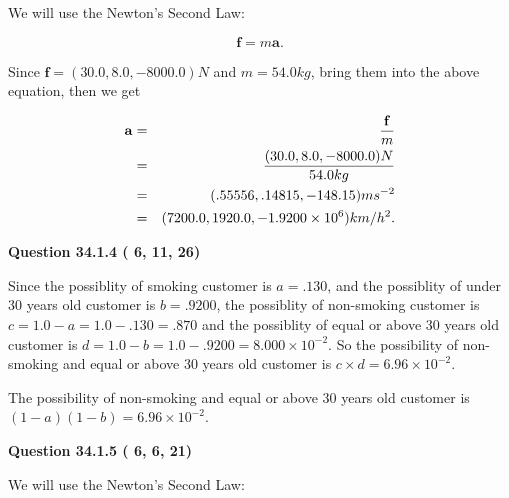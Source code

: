 \documentclass[12pt]{article}
\begin{document}
We will use the Newton's Second Law:
 
\[
\mathbf{f}=m\mathbf{a}.
\]
 
Since $\mathbf{f}=( %
30.0,  %
8.0,  %
-8000.0 )N$
and $m= %
54.0 kg$, bring them into the above equation, then we get
 
\begin{eqnarray*}
\mathbf{a}&=&\frac{\mathbf{f}}m  \\
&=&\frac{(
30.0 ,
8.0 ,
-8000.0 )N
}{ %
54.0 kg}  \\
&=&(
.55556 ,
.14815,
-148.15
)ms^{-2} \\
&=&(
7200.0 ,
1920.0 ,
-1.9200 \times 10^{6}
)km/h^2.
\end{eqnarray*}
 
 
 
  
\vspace{0.2in}
  
{\textbf{\Large{Question
34.1.4 
 (          6,         11,         26)
}}}
  
  
 
 
\noindent{}

Since the possiblity of  %
smoking customer is $ a =  %
.130 $,
and the possiblity of  %
 under 30 years old customer is $ b =  %
.9200 $,
the possiblity of  %
non-smoking customer is $ c = 1.0 - a = 1.0 -
.130
=  %
.870 $ and the possiblity of  %
equal or above 30 years old
customer is $ d = 1.0 - b = 1.0 -  %
.9200 =  %
8.000 \times 10^{-2}  $.
So the possibility of  %
 non-smoking and  %
equal or above 30 years old
customer is $ c \times d =  %
6.96 \times 10^{-2} $.
 
 
 
 
 
\noindent{}

The possibility of  %
 non-smoking and  %
equal or above 30 years old
customer is $ (1-a)(1-b) =  %
6.96 \times 10^{-2} $.
 
 
  
\vspace{0.2in}
  
{\textbf{\Large{Question
34.1.5 
 (          6,          6,         21)
}}}
  
  
 
 
\noindent{}

We will use the Newton's Second Law:
 
\end{document}
